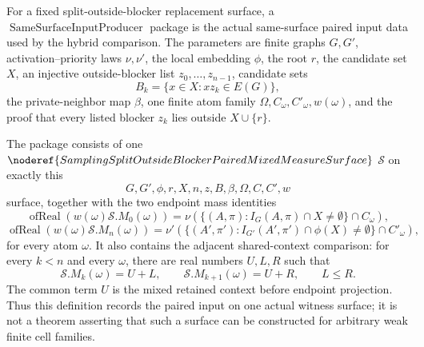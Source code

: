\begin{definition}
For a fixed split-outside-blocker replacement surface, a
\(\operatorname{SameSurfaceInputProducer}\) package is the actual
same-surface paired input data used by the hybrid comparison.  The parameters
are finite graphs \(G,G'\), activation--priority laws \(\nu,\nu'\), the local
embedding \(\phi\), the root \(r\), the candidate set \(X\), an injective
outside-blocker list \(z_0,\ldots,z_{n-1}\), candidate sets
\[
  B_k=\{x\in X:xz_k\in E(G)\},
\]
the private-neighbor map \(\beta\), one finite atom family
\(\Omega,C_\omega,C'_\omega,w(\omega)\), and the proof that every listed
blocker \(z_k\) lies outside \(X\cup\{r\}\).

The package consists of one
\(\noderef{SamplingSplitOutsideBlockerPairedMixedMeasureSurface}\)
\(\mathcal S\) on exactly this
\[
  G,G',\phi,r,X,n,z,B,\beta,\Omega,C,C',w
\]
surface, together with the two endpoint mass identities
\[
  \operatorname{ofReal}(w(\omega)\mathcal S.M_0(\omega))
  =
  \nu(\{(A,\pi):I_G(A,\pi)\cap X\ne\emptyset\}\cap C_\omega),
\]
\[
  \operatorname{ofReal}(w(\omega)\mathcal S.M_n(\omega))
  =
  \nu'(\{(A',\pi'):I_{G'}(A',\pi')\cap\phi(X)\ne\emptyset\}\cap C'_\omega),
\]
for every atom \(\omega\).  It also contains the adjacent shared-context
comparison: for every \(k<n\) and every \(\omega\), there are real numbers
\(U,L,R\) such that
\[
  \mathcal S.M_k(\omega)=U+L,\qquad
  \mathcal S.M_{k+1}(\omega)=U+R,\qquad
  L\le R .
\]
The common term \(U\) is the mixed retained context before endpoint
projection.  Thus this definition records the paired input on one actual
witness surface; it is not a theorem asserting that such a surface can be
constructed for arbitrary weak finite cell families.
\end{definition}
